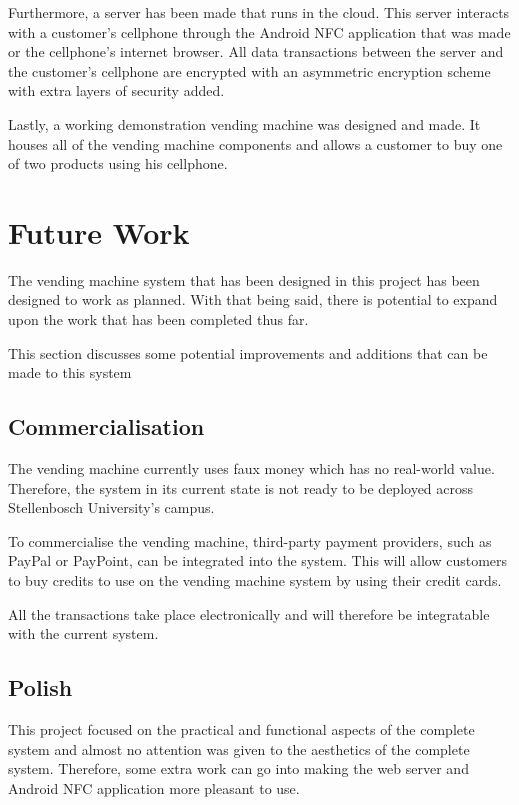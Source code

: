 Furthermore, a server has been made that runs in the cloud. This server interacts with a
customer's cellphone through the Android NFC application that was made or the cellphone's
internet browser. All data transactions between the server and the customer's cellphone
are encrypted with an asymmetric encryption scheme with extra layers of security added.

Lastly, a working demonstration vending machine was designed and made. It houses all of
the vending machine components and allows a customer to buy one of two products using
his cellphone. 

\section{Future Work}

The vending machine system that has been designed in this project has been designed to
work as planned. With that being said, there is potential to expand upon the work that has
been completed thus far.

This section discusses some potential improvements and additions that can be made to this
system

\subsection{Commercialisation}

The vending machine currently uses faux money which has no real-world value. Therefore,
the system in its current state is not ready to be deployed across Stellenbosch
University's campus. 

To commercialise the vending machine, third-party payment providers, such
as PayPal or PayPoint, can be integrated into the system. This will allow customers to
buy credits to use on the vending machine system by using their credit cards. 

All the transactions take place electronically and will therefore be integratable with the
current system. 

\subsection{Polish}

This project focused on the practical and functional aspects of the complete system and
almost no attention was given to the aesthetics of the complete system. Therefore, some
extra work can go into making the web server and Android NFC application more pleasant to use. 

